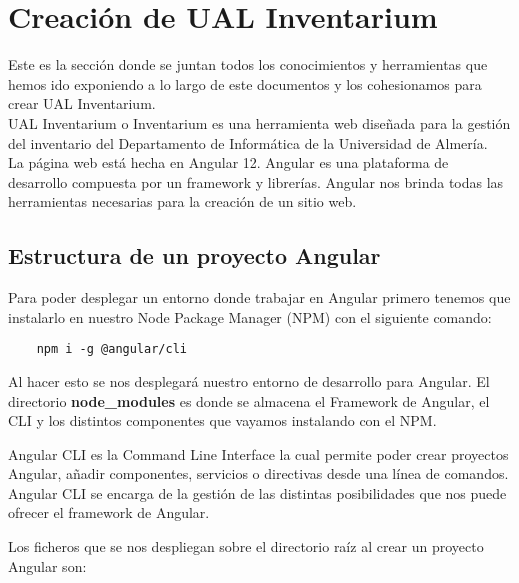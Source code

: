 \section{Creación de UAL Inventarium}
Este es la sección donde se juntan todos los conocimientos y herramientas que hemos ido exponiendo a lo largo de este documentos y los cohesionamos para crear UAL Inventarium.
\\UAL Inventarium o Inventarium es una herramienta web diseñada para la gestión del inventario del Departamento de Informática de la Universidad de Almería.
\\La página web está hecha en Angular 12. Angular es una plataforma de desarrollo compuesta por un framework y librerías. Angular nos brinda todas las herramientas necesarias para la creación de un sitio web.

\subsection{Estructura de un proyecto Angular}
Para poder desplegar un entorno donde trabajar en Angular primero tenemos que instalarlo en nuestro Node Package Manager (NPM) con el siguiente comando:
\begin{verbatim}
    npm i -g @angular/cli
\end{verbatim}
Al hacer esto se nos desplegará nuestro entorno de desarrollo para Angular. El directorio \textbf{node\_modules} es donde se almacena el Framework de Angular, el CLI y los distintos componentes que vayamos instalando con el NPM.
\begin{tcolorbox}
    [colback=green!5!white,colframe=green!75!black,fonttitle=\bfseries,title=¿Qué diferencias hay entre Angular CLI y Angular Framework?]
    Angular CLI es la Command Line Interface la cual permite poder crear proyectos Angular, añadir componentes, servicios o directivas desde una línea de comandos. Angular CLI se encarga de la gestión de las distintas posibilidades que nos puede ofrecer el framework de Angular.
\end{tcolorbox}
Los ficheros que se nos despliegan sobre el directorio raíz al crear un proyecto Angular son:
